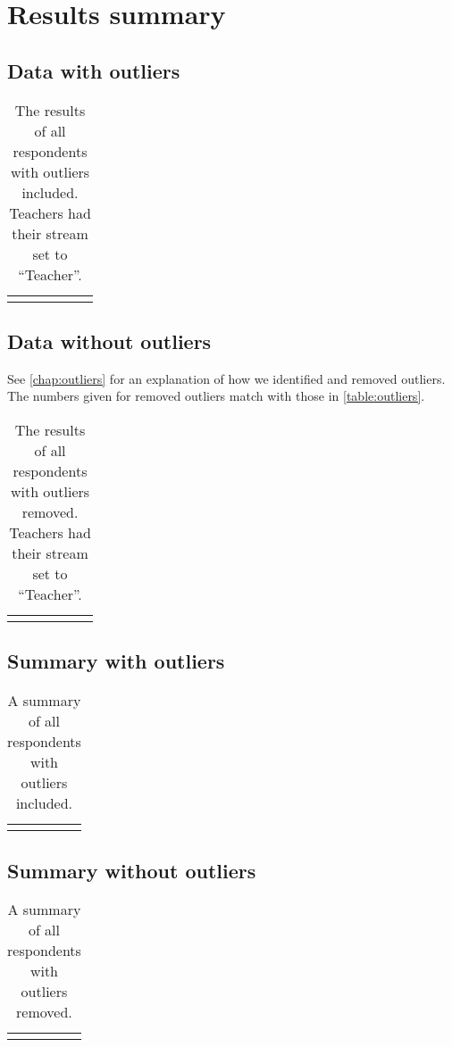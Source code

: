 \chapter{Results summary}

\section{Data with outliers}
\begin{longtable}{rrrlll}
	\caption{The results of all respondents with outliers included. Teachers had their stream set to ``Teacher''.}\\
	\label{table:outliers}
	
\end{longtable}

\section{Data without outliers}
See \vref{chap:outliers} for an explanation of how we identified and removed outliers.
The numbers given for removed outliers match with those in \vref{table:outliers}.
\begin{longtable}{rrrlll}
	\caption{The results of all respondents with outliers removed. Teachers had their stream set to ``Teacher''.}\\
	\label{table:noOutliers}
	
\end{longtable}

\section{Summary with outliers}
\begin{longtable}{c|c}
	\caption{A summary of all respondents with outliers included.}\\
	\label{table:outliersSummary}
	
\end{longtable}

\section{Summary without outliers}
\begin{longtable}{c|c}
	\caption{A summary of all respondents with outliers removed.}\\
	\label{table:noOutliersSummary}
	
\end{longtable}
